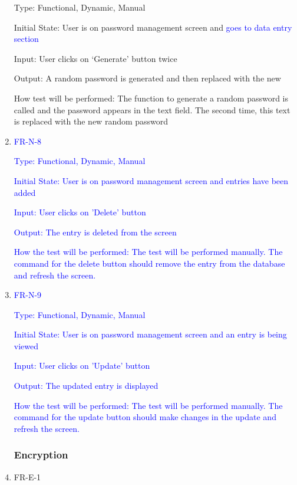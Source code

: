 \documentclass[12pt, titlepage]{article}
\begin{document}
\begin{enumerate}
Type: Functional, Dynamic, Manual

Initial State: User is on password management screen and \textcolor{blue}{goes to data entry section}

Input: User clicks on ‘Generate’ button twice

Output: A random password is generated and then replaced with the new 

How test will be performed: The function to generate a random password is called and the password appears in the text field. The second time, this text is replaced with the new random password

\item{\textcolor{blue}{FR-N-8}\\}

\textcolor{blue}{Type: Functional, Dynamic, Manual}

\textcolor{blue}{Initial State: User is on password management screen and entries have been added}

\textcolor{blue}{Input: User clicks on 'Delete' button}

\textcolor{blue}{Output: The entry is deleted from the screen}

\textcolor{blue}{How the test will be performed: The test will be performed manually. The command for the delete button should remove the entry from the database and refresh the screen.}

\item{\textcolor{blue}{FR-N-9}\\}

\textcolor{blue}{Type: Functional, Dynamic, Manual}

\textcolor{blue}{Initial State: User is on password management screen and an entry is being viewed}

\textcolor{blue}{Input: User clicks on 'Update' button}

\textcolor{blue}{Output: The updated entry is displayed}

\textcolor{blue}{How the test will be performed: The test will be performed manually. The command for the update button should make changes in the update and refresh the screen.}

\subsubsection{Encryption}

\item{FR-E-1\\}


\end{enumerate}
\end{document}
